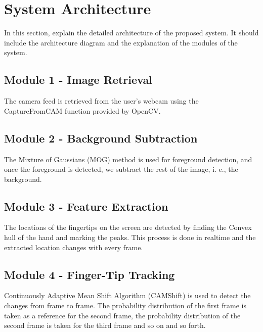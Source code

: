 \documentclass{scrreprt}
\begin{document}
\chapter{System Architecture}
In this section, explain the detailed architecture of the proposed system.
It should include the architecture diagram and the explanation of the modules of the system.
\\

\section{Module 1 - Image Retrieval}
The camera feed is retrieved from the user's webcam using the CaptureFromCAM function provided by OpenCV.

\section{Module 2 - Background Subtraction}
The Mixture of Gaussians (MOG) method is used for foreground detection, and once the foreground is detected, we subtract the rest of the image, i. e., the background.

\section{Module 3 - Feature Extraction}
The locations of the fingertips on the screen are detected by finding the Convex hull of the hand and marking the peaks. This process is done in realtime and the extracted location changes with every frame.

\section{Module 4 - Finger-Tip Tracking}
Continuously Adaptive Mean Shift Algorithm (CAMShift) is used to detect the changes from frame to frame. The probability distribution of the first frame is taken as a reference for the second frame, the probability distribution of the second frame is taken for the third frame and so on and so forth.
\end{document}

